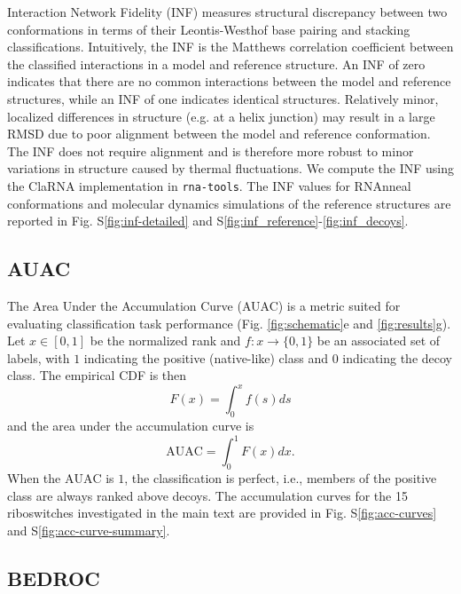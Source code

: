 \documentclass[%
aip,
 amsmath,amssymb,
reprint,%
onecolumn,
]{revtex4-1}
\makeatletter
\newcommand\setcurrentname[1]{\def\@currentlabelname{#1}}
\makeatother
\begin{document}
{Interaction Network Fidelity (INF) measures structural discrepancy between two conformations in terms of their Leontis-Westhof base pairing and stacking classifications.\cite{parisien2009new} Intuitively, the INF is the Matthews correlation coefficient between the classified interactions in a model and reference structure. An INF of zero indicates that there are no common interactions between the model and reference structures, while an INF of one indicates identical structures. Relatively minor, localized differences in structure (e.g. at a helix junction) may result in a large RMSD due to poor alignment between the model and reference conformation. The INF does not require alignment and is therefore more robust to minor variations in structure caused by thermal fluctuations. We compute the INF using the ClaRNA\cite{walen2014clarna} implementation in \texttt{rna-tools}\cite{magnus2020rna}. The INF values for RNAnneal conformations and molecular dynamics simulations of the reference structures are reported in Fig. S\ref{fig:inf-detailed} and S\ref{fig:inf_reference}-\ref{fig:inf_decoys}.

\subsection*{AUAC}
       \setcurrentname{AUAC}
\label{methods:auac}
The Area Under the Accumulation Curve (AUAC) is a metric suited for evaluating classification task performance (Fig. \ref{fig:schematic}e and \ref{fig:results}g).\cite{truchon2007evaluating} Let $x\in [0,1]$ be the normalized rank and $f:x \rightarrow \{0,1\}$ be an associated set of labels, with $1$ indicating the positive (native-like) class and $0$ indicating the decoy class. The empirical CDF is then
\begin{equation}
    F(x) = \int_0^x f(s)ds
\end{equation}
and the area under the accumulation curve is 
\begin{equation}
    \label{eq:auac}
    \mathrm{AUAC} = \int_0^1 F(x)dx.
\end{equation}
When the $\mathrm{AUAC}$ is $1$, the classification is perfect, i.e., members of the positive class are always ranked above decoys. The accumulation curves for the 15 riboswitches investigated in the main text are provided in Fig. S\ref{fig:acc-curves} and S\ref{fig:acc-curve-summary}.

\subsection*{BEDROC}
       \setcurrentname{BEDROC}
\label{methods:bedroc}


}
\end{document}
